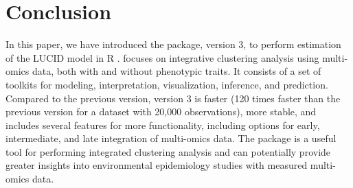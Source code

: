 \section{Conclusion}
In this paper, we have introduced the  package, version 3, to perform estimation of the LUCID model in R \citep{LUCIDus}.  focuses on integrative clustering analysis using multi-omics data, both with and without phenotypic traits. It consists of a set of toolkits for modeling, interpretation, visualization, inference, and prediction. Compared to the previous version,  version 3 is faster (120 times faster than the previous version for a dataset with 20,000 observations), more stable, and includes several features for more functionality, including options for early, intermediate, and late integration of multi-omics data. The  package is a useful tool for performing integrated clustering analysis and can potentially provide greater insights into environmental epidemiology studies with measured multi-omics data.

\address{Yinqi Zhao\\
  Division of Biostatistics, Department of Population and Public Health Sciences, University of Southern California\\
  2001 N Soto St., Los Angeles, CA, 90032\\
  United States\\
  ORCiD: 0000-0003-2413-732X\\
  }
\address{Qiran Jia\\
  Division of Biostatistics, Department of Population and Public Health Sciences, University of Southern California\\
  2001 N Soto St., Los Angeles, CA, 90032\\
  United States\\
  ORCiD: 0000-0002-0790-5967\\
  }
\address{Jesse A. Goodrich\\
  Division of Environmental Epidemiology, Department of Population and Public Health Sciences, University of Southern California\\
  2001 N Soto St., Los Angeles, CA, 90032\\
  United States\\
  ORCid: 0000-0001-6615-0472\\
  }
\address{David V. Conti\\
  Division of Biostatistics, Department of Population and Public Health Sciences, University of Southern California\\
  2001 N Soto St., Los Angeles, CA, 90032\\
  United States\\
  ORCid: 0000-0002-2941-7833\\
  }
